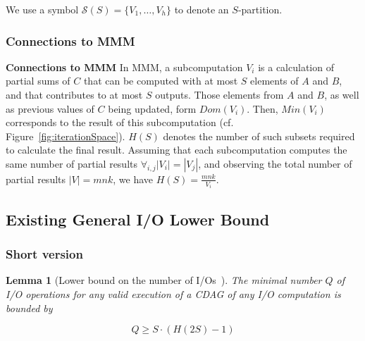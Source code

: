 \documentclass[sigplan,review,anonymous]{acmart}\settopmatter{printfolios=true,printccs=false,printacmref=false}
\newcommand\mac[1]{\textcolor{red}{[Mac: #1]}}
\newtheorem{lma}{Lemma}
\newcommand{\macb}[1]{\textbf{\textsf{#1}}}
\begin{document}
We use a symbol $\mathcal{S}(S) = \{V_1, \dots , V_h\}$ to 
denote an $S$-partition.
%

\subsubsection{Connections to MMM}
\macb{Connections to MMM}
%
In MMM, a subcomputation $V_i$ is a calculation of partial sums of $C$ that can
be computed with at most $S$ elements of $A$ and $B$, and that contributes to
at most $S$ outputs. Those elements from $A$ and $B$, as well as previous
values of $C$ being updated, form $Dom(V_i)$. Then, $Min(V_i)$ corresponds to
the result of this subcomputation (cf.~
Figure~\ref{fig:iterationSpace}). $H(S)$ denotes 
the
number of such subsets required to calculate the final result. Assuming that 
each subcomputation computes the same number of partial results 
$\forall_{i,j}|V_i| = |V_j|$, and observing the total number of partial results 
$|V| = mnk$, we have $H(S) = \frac{mnk}{V_i}$.

\subsection{Existing General I/O Lower Bound}
\label{sec:spartProof}

\subsubsection{Short version}

\begin{lma}[Lower bound on the number of I/Os~\cite{redblue}]
	\label{lma:spartlemma}
	The minimal number $Q$ of I/O operations for any valid execution of a CDAG 
	of
	any I/O computation is bounded by
	
	\begin{equation}
	\label{eq:redbluebound}
	Q \ge S \cdot (H(2S) - 1)
	\end{equation}
\end{lma}
\end{document}
